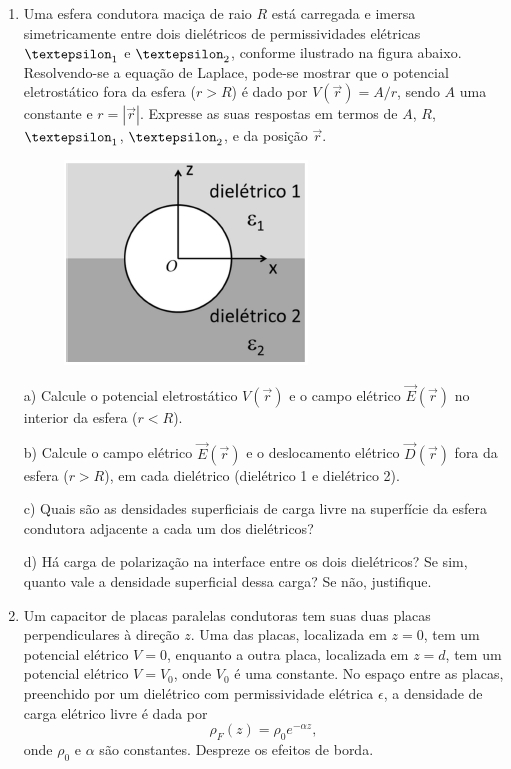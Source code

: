 \begin{enumerate}[start=1,label={\bfseries Q\arabic*.}]
\resposta




\item Uma esfera condutora maciça de raio $R$ está carregada e imersa simetricamente entre dois dielétricos de permissividades elétricas $\textepsilon_{1}$ e $\textepsilon_{2}$, conforme ilustrado na figura abaixo. Resolvendo-se a equação de Laplace, pode-se mostrar que o potencial eletrostático fora da esfera ($r > R$) é dado por $V(\vec{r}) = A/r$, sendo $A$ uma constante e $r = |\vec{r}|$. Expresse as suas respostas em termos de $A$, $R$, $\textepsilon_{1}$, $\textepsilon_{2}$, e da posição $\vec{r}$.

\begin{figure}[H]
\centering
\includegraphics[scale=1]{eletromag-img/dieletrico}
\end{figure}


a) Calcule o potencial eletrostático $V(\vec{r})$ e o campo elétrico $\vec{E}(\vec{r})$ no interior da esfera ($r < R$).

\resposta

b) Calcule o campo elétrico $\vec{E}(\vec{r})$ e o deslocamento elétrico $\vec{D}(\vec{r})$ fora da esfera ($r > R$), em cada dielétrico (dielétrico 1 e dielétrico 2).

\resposta

c) Quais são as densidades superficiais de carga livre na superfície da esfera condutora adjacente a cada um dos dielétricos?

\resposta

d) Há carga de polarização na interface entre os dois dielétricos? Se sim, quanto vale a densidade superficial dessa carga? Se não, justifique.

\resposta




\item Um capacitor de placas paralelas condutoras tem suas duas placas perpendiculares à direção $z$. Uma das placas, localizada em $z = 0$, tem um potencial elétrico $V = 0$, enquanto a outra placa, localizada em $z = d$, tem um potencial elétrico $V = V_{0}$, onde $V_{0}$ é uma constante. No espaço entre as placas, preenchido por um dielétrico com permissividade elétrica $\epsilon$, a densidade de carga elétrico livre é dada por
$$
\rho_{F}(z) = \rho_{0} e^{-\alpha z},
$$
onde $\rho_{0}$ e $\alpha$ são constantes. Despreze os efeitos de borda.




\end{enumerate}
